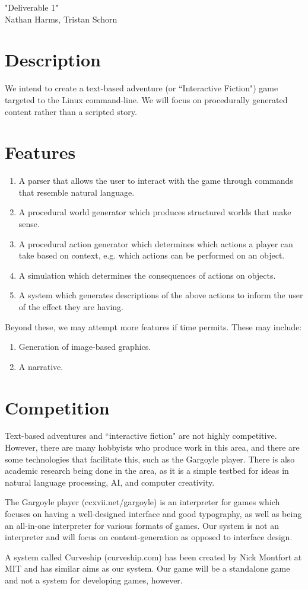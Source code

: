 \documentclass{article}
\begin{document}
\begin{center}
"Deliverable 1"\\
Nathan Harms, Tristan Schorn
\end{center}

\section{Description}
We intend to create a text-based adventure (or ``Interactive Fiction") game
targeted to the Linux command-line. We will focus on procedurally generated
content rather than a scripted story.

\section{Features}
\begin{enumerate}
  \item A parser that allows the user to interact with the game through commands
    that resemble natural language.
  \item A procedural world generator which produces structured worlds that make
    sense.
  \item A procedural action generator which determines which actions a player
    can take based on context, e.g. which actions can be performed on an object.
  \item A simulation which determines the consequences of actions on objects.
  \item A system which generates descriptions of the above actions to inform the
    user of the effect they are having.
\end{enumerate}

Beyond these, we may attempt more features if time permits. These may include:
\begin{enumerate}
  \item Generation of image-based graphics.
  \item A narrative.
\end{enumerate}

\section{Competition}
Text-based adventures and ``interactive fiction" are not highly competitive.
However, there are many hobbyists who produce work in this area, and there are
some technologies that facilitate this, such as the Gargoyle player. There is
also academic research being done in the area, as it is a simple testbed for
ideas in natural language processing, AI, and computer creativity.

The Gargoyle player (ccxvii.net/gargoyle) is an interpreter for games which
focuses on having a well-designed interface and good typography, as well as
being an all-in-one interpreter for various formats of games. Our system is not
an interpreter and will focus on content-generation as opposed to interface
design.

A system called Curveship (curveship.com) has been created by Nick Montfort at
MIT and has similar aims as our system. Our game will be a standalone game and
not a system for developing games, however.
\end{document}

